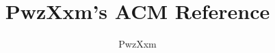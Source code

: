 \documentclass[twocolumn,a4paper,twoside,11pt]{article}
\title{\bfseries PwzXxm's ACM Reference}
\author{PwzXxm}
\begin{document}
\small
\begin{titlepage}
    \maketitle
\end{titlepage}

\newpage
\pagestyle{plain}
\tableofcontents
\newpage
\clearpage
\newpage
\pagestyle{fancy}
\setcounter{page}{1}
\setcounter{section}{0}
\end{document}

